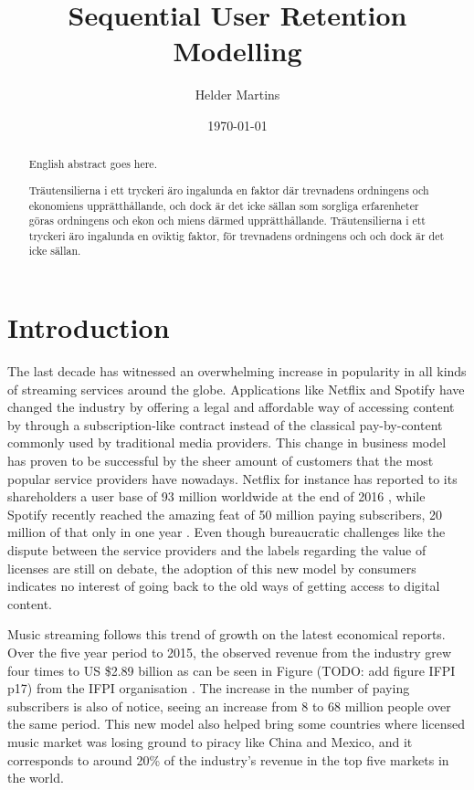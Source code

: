 \documentclass{kththesis}
\title{Sequential User Retention Modelling}
\author{Helder Martins}
\date{\today}
\begin{document}
\flyleaf

\begin{abstract}
  English abstract goes here.
\end{abstract}

\clearpage

\begin{otherlanguage}{swedish}
  \begin{abstract}
    Träutensilierna i ett tryckeri äro ingalunda en faktor där
    trevnadens ordningens och ekonomiens upprätthållande, och dock är
    det icke sällan som sorgliga erfarenheter göras ordningens och
    ekon och miens därmed upprätthållande. Träutensilierna i ett
    tryckeri äro ingalunda en oviktig faktor, för trevnadens
    ordningens och och dock är det icke sällan.
  \end{abstract}
\end{otherlanguage}

\cleardoublepage

\tableofcontents


\mainmatter


\chapter{Introduction}

	The last decade has witnessed an overwhelming increase in popularity in all kinds of streaming services around the globe. Applications like Netflix and Spotify have changed the industry by offering a legal and affordable way of accessing content by through a subscription-like contract instead of the classical pay-by-content commonly used by traditional media providers. This change in business model has proven to be successful by the sheer amount of customers that the most popular service providers have nowadays. Netflix for instance has reported to its shareholders a user base of 93 million worldwide at the end of 2016 \citep{netflixsh}, while Spotify recently reached the amazing feat of 50 million paying subscribers, 20 million of that only in one year \citep{spotifypress}. Even though bureaucratic challenges like the dispute between the service providers and the labels regarding the value of licenses are still on debate, the adoption of this new model by consumers indicates no interest of going back to the old ways of getting access to digital content.

	Music streaming follows this trend of growth on the latest economical reports. Over the five year period to 2015, the observed revenue from the industry grew four times to US \$2.89 billion as can be seen in Figure (TODO: add figure IFPI p17) from the IFPI organisation \citep{ifpi}. The increase in the number of paying subscribers is also of notice, seeing an increase from 8 to 68 million people over the same period. This new model also helped bring some countries where licensed music market was losing ground to piracy like China and Mexico, and it corresponds to around 20\% of the industry's revenue in the top five markets in the world. 
	
\end{document}
